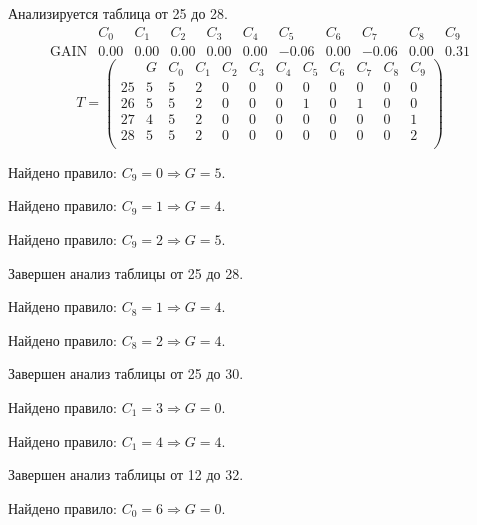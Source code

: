 Анализируется таблица от 25 до 28.
$$ 
\begin{array}{lccccccccc|c|}
	  & C_{0} & C_{1} & C_{2} & C_{3} & C_{4} & C_{5} & C_{6} & C_{7} & C_{8} & C_{9}\\
 \textrm{GAIN} & 0.00 & 0.00 & 0.00 & 0.00 & 0.00 & -0.06 & 0.00 & -0.06 & 0.00 & 0.31
\end{array}
 $$
$$
T = \left( \begin{array}{lcccccccccc|c|}
	 & G & C_{0} & C_{1} & C_{2} & C_{3} & C_{4} & C_{5} & C_{6} & C_{7} & C_{8} & C_{9}\\
	25 & 5 & 5 & 2 & 0 & 0 & 0 & 0 & 0 & 0 & 0 & 0\\
	26 & 5 & 5 & 2 & 0 & 0 & 0 & 1 & 0 & 1 & 0 & 0\\
	27 & 4 & 5 & 2 & 0 & 0 & 0 & 0 & 0 & 0 & 0 & 1\\
	28 & 5 & 5 & 2 & 0 & 0 & 0 & 0 & 0 & 0 & 0 & 2\\
\end{array} \right)
$$

Найдено правило: $C_{9} = 0 \Longrightarrow G = 5$.

Найдено правило: $C_{9} = 1 \Longrightarrow G = 4$.

Найдено правило: $C_{9} = 2 \Longrightarrow G = 5$.

Завершен анализ таблицы от 25 до 28.

Найдено правило: $C_{8} = 1 \Longrightarrow G = 4$.

Найдено правило: $C_{8} = 2 \Longrightarrow G = 4$.

Завершен анализ таблицы от 25 до 30.

Найдено правило: $C_{1} = 3 \Longrightarrow G = 0$.

Найдено правило: $C_{1} = 4 \Longrightarrow G = 4$.

Завершен анализ таблицы от 12 до 32.

Найдено правило: $C_{0} = 6 \Longrightarrow G = 0$.

